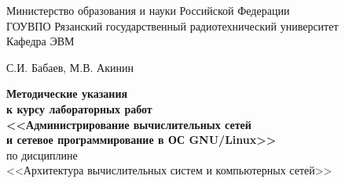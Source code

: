 
\newcommand{\docdisc}{Архитектура вычислительных систем и компьютерных сетей}	%
\newcommand{\dockaf}{ЭВМ}

\begin{titlepage}

\begin{center}

Министерство образования и науки Российской Федерации\\ГОУВПО Рязанский государственный радиотехнический университет\\
Кафедра \dockaf\\

\vfill

С.И. Бабаев, М.В. Акинин

\vfill

{\bf\Large Методические указания \\ к курсу лабораторных работ \\
\bigskip
<<Администрирование вычислительных сетей \\ и сетевое программирование в ОС GNU/Linux>>} \\
\bigskip
\large по дисциплине \\
\large <<\docdisc>>

\end{center}

\vfill




\vspace{5em}

\thispagestyle{empty}

\end{titlepage}

\setcounter{page}{2}

\newpage

